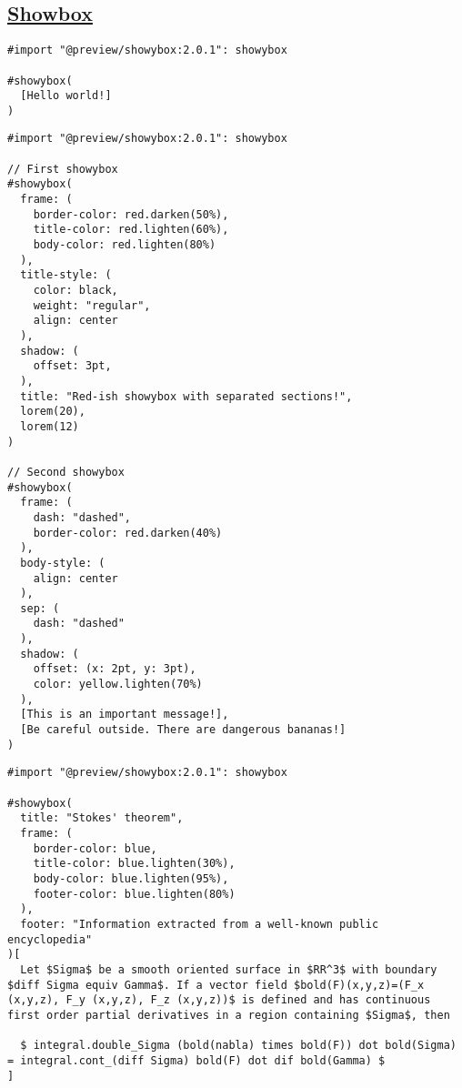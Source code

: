 \subsection{\texorpdfstring{\hyperref[showbox]{Showbox}}{Showbox}}\label{showbox}

\begin{verbatim}
#import "@preview/showybox:2.0.1": showybox

#showybox(
  [Hello world!]
)
\end{verbatim}

\pandocbounded{}

\begin{verbatim}
#import "@preview/showybox:2.0.1": showybox

// First showybox
#showybox(
  frame: (
    border-color: red.darken(50%),
    title-color: red.lighten(60%),
    body-color: red.lighten(80%)
  ),
  title-style: (
    color: black,
    weight: "regular",
    align: center
  ),
  shadow: (
    offset: 3pt,
  ),
  title: "Red-ish showybox with separated sections!",
  lorem(20),
  lorem(12)
)

// Second showybox
#showybox(
  frame: (
    dash: "dashed",
    border-color: red.darken(40%)
  ),
  body-style: (
    align: center
  ),
  sep: (
    dash: "dashed"
  ),
  shadow: (
    offset: (x: 2pt, y: 3pt),
    color: yellow.lighten(70%)
  ),
  [This is an important message!],
  [Be careful outside. There are dangerous bananas!]
)
\end{verbatim}

\pandocbounded{}

\begin{verbatim}
#import "@preview/showybox:2.0.1": showybox

#showybox(
  title: "Stokes' theorem",
  frame: (
    border-color: blue,
    title-color: blue.lighten(30%),
    body-color: blue.lighten(95%),
    footer-color: blue.lighten(80%)
  ),
  footer: "Information extracted from a well-known public encyclopedia"
)[
  Let $Sigma$ be a smooth oriented surface in $RR^3$ with boundary $diff Sigma equiv Gamma$. If a vector field $bold(F)(x,y,z)=(F_x (x,y,z), F_y (x,y,z), F_z (x,y,z))$ is defined and has continuous first order partial derivatives in a region containing $Sigma$, then

  $ integral.double_Sigma (bold(nabla) times bold(F)) dot bold(Sigma) = integral.cont_(diff Sigma) bold(F) dot dif bold(Gamma) $
]
\end{verbatim}

